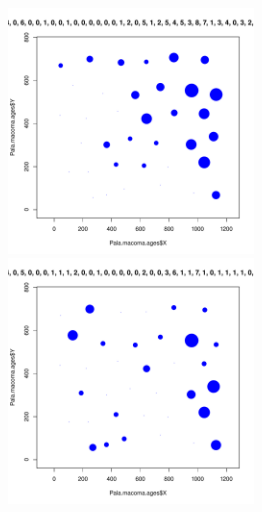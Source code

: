 \documentclass[12pt, a4paper]{disser}
\begin{document}
\begin{figure}[h]
	
	\begin{minipage}[b]{.46\linewidth}
	\begin{center}
		\includegraphics[width=65mm]{./Pala_macoma_age_bubb_N3_.pdf}
	\end{center}
	\end{minipage}
	\hfil %
	\begin{minipage}[b]{.46\linewidth}
	\begin{center}
		\includegraphics[width=65mm]{./Pala_macoma_age_bubb_N4_.pdf}
	\end{center}
	\end{minipage}






\end{figure}
\end{document}
